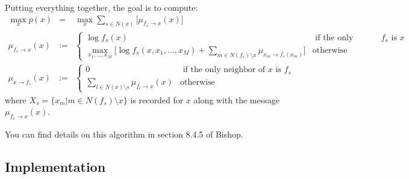 \documentclass[11pt]{article}
\begin{document}
Putting everything together, the goal is to compute:
\begin{eqnarray}
\max\limits_x p(x) &=& \max_x \sum_{s \in N(x)} \Bigg[ \mu_{f_s \rightarrow x}(x) \Bigg] \\
\mu_{f_s \rightarrow x}(x) &:=& \left\{ \begin{array}{ll}
                                    \log f_s(x) & \text{ if the only neighbor of $f_s$ is $x$} \\
                                    \max\limits_{x_1,\ldots,x_M} \Bigg[ \log f_s(x,x_1,\ldots,x_M) + \sum\limits_{m \in N(f_s) \setminus x} \mu_{x_m \rightarrow f_s(x_m)} \Bigg] & \text{otherwise}
                                          \end{array} \right. \\
\mu_{x \rightarrow f_s}(x) &:=& \left\{ \begin{array}{ll}
                                    0 & \text{ if the only neighbor of $x$ is $f_s$} \\
                                    \sum\limits_{l \in N(x) \setminus s} \mu_{f_l \rightarrow x}(x) & \text{otherwise}
                                          \end{array} \right.
\end{eqnarray}
where $X_s=\{x_m|m \in N(f_s) \setminus x\}$ is recorded for $x$ along with the message $\mu_{f_s \rightarrow x}(x)$.

You can find details on this algorithm in section 8.4.5 of Bishop.

\subsection{Implementation} %
\end{document}
